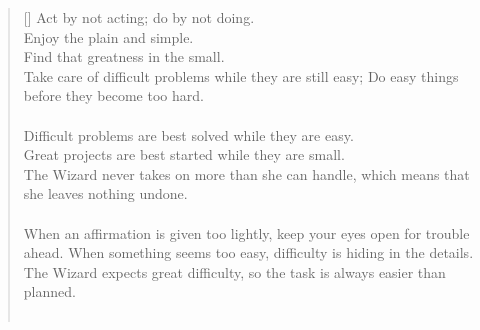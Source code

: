 \documentclass{article}
\begin{document}
\settowidth{\versewidth}{The Wizard leads byemptying people’s minds, filling their bellies, weakening their am- bitions, and making them become strong}
\begin{verse}[\versewidth]
Act by not acting; do by not doing.\\
Enjoy the plain and simple.\\
Find that greatness in the small.\\
Take care of difficult problems while they are still easy;
Do easy things before they become too hard.\\
\hfill\\
Difficult problems are best solved while they are easy.\\
Great projects are best started while they are small.\\
The Wizard never takes on more than she can handle, which means that she leaves nothing undone.\\
\hfill\\
When an affirmation is given too lightly, keep your eyes open for trouble ahead. When something seems too easy, difficulty is hiding in the details.\\
The Wizard expects great difficulty, so the task is always easier than planned.\\
\hfill\\
\end{verse}
\end{document}
